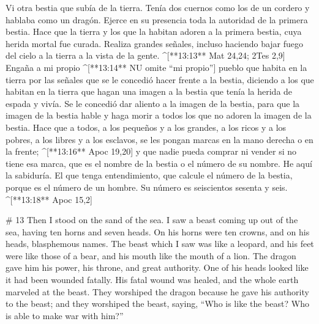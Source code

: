\begin{paracols}{2}
 Vi otra bestia que subía de la tierra. Tenía dos cuernos como los de un cordero y hablaba como un dragón.  Ejerce en su presencia toda la autoridad de la primera bestia. Hace que la tierra y los que la habitan adoren a la primera bestia, cuya herida mortal fue curada.  Realiza grandes señales, incluso haciendo bajar fuego del cielo a la tierra a la vista de la gente. ^[**13:13** Mat 24,24; 2Tes 2,9]  Engaña a mi propio ^[**13:14** NU omite “mi propio”] pueblo que habita en la tierra por las señales que se le concedió hacer frente a la bestia, diciendo a los que habitan en la tierra que hagan una imagen a la bestia que tenía la herida de espada y vivía.  Se le concedió dar aliento a la imagen de la bestia, para que la imagen de la bestia hable y haga morir a todos los que no adoren la imagen de la bestia.  Hace que a todos, a los pequeños y a los grandes, a los ricos y a los pobres, a los libres y a los esclavos, se les pongan marcas en la mano derecha o en la frente; ^[**13:16** Apoc 19,20]  y que nadie pueda comprar ni vender si no tiene esa marca, que es el nombre de la bestia o el número de su nombre.  He aquí la sabiduría. El que tenga entendimiento, que calcule el número de la bestia, porque es el número de un hombre. Su número es seiscientos sesenta y seis. ^[**13:18** Apoc 15,2]

\switchcolumn
\begin{english}

# 13
 Then I stood on the sand of the sea. I saw a beast coming up out of the sea, having ten horns and seven heads. On his horns were ten crowns, and on his heads, blasphemous names.  The beast which I saw was like a leopard, and his feet were like those of a bear, and his mouth like the mouth of a lion. The dragon gave him his power, his throne, and great authority.  One of his heads looked like it had been wounded fatally. His fatal wound was healed, and the whole earth marveled at the beast.  They worshiped the dragon because he gave his authority to the beast; and they worshiped the beast, saying, “Who is like the beast? Who is able to make war with him?” 


\end{english}
\end{paracols}
